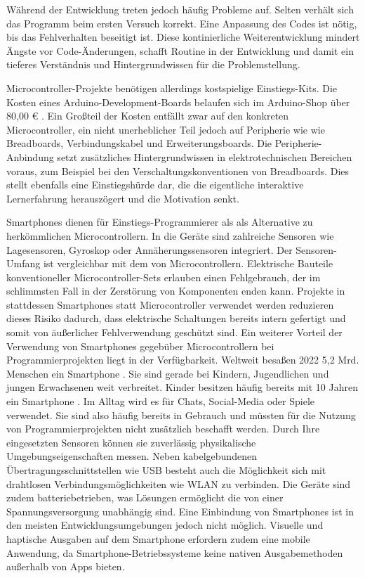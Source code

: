 \documentclass[11pt,a4paper]{report}
\begin{document}
Während der Entwicklung treten jedoch häufig Probleme auf.
Selten verhält sich das Programm beim ersten Versuch korrekt.
Eine Anpassung des Codes ist nötig, bis das Fehlverhalten beseitigt ist.
Diese kontinierliche Weiterentwicklung mindert Ängste vor Code-Änderungen, schafft Routine in der Entwicklung und damit ein tieferes Verständnis und Hintergrundwissen für die Problemstellung.

Microcontroller-Projekte benötigen allerdings kostspielige Einstiegs-Kits.
Die Kosten eines Arduino-Development-Boards belaufen sich im Arduino-Shop über 80,00 € \cite{arduino_kit}.
Ein Großteil der Kosten entfällt zwar auf den konkreten Microcontroller, ein nicht unerheblicher Teil jedoch auf Peripherie wie wie Breadboards, Verbindungskabel und Erweiterungsboards.
Die Peripherie-Anbindung setzt zusätzliches Hintergrundwissen in elektrotechnischen Bereichen voraus, zum  Beispiel bei den Verschaltungskonventionen von Breadboards.
Dies stellt ebenfalls eine Einstiegshürde dar, die die eigentliche interaktive Lernerfahrung herauszögert und die Motivation senkt.

Smartphones dienen für Einstiegs-Programmierer als als Alternative zu herkömmlichen Microcontrollern.
In die Geräte sind zahlreiche Sensoren wie Lagesensoren, Gyroskop oder Annäherungssensoren integriert.
Der Sensoren-Umfang ist vergleichbar mit dem von Microcontrollern.
Elektrische Bauteile konventioneller Microcontroller-Sets erlauben einen Fehlgebrauch, der im schlimmsten Fall in der Zerstörung von Komponenten enden kann.
Projekte in stattdessen Smartphones statt Microcontroller verwendet werden reduzieren dieses Risiko dadurch, dass elektrische Schaltungen bereits intern gefertigt und somit von äußerlicher Fehlverwendung geschützt sind.
Ein weiterer Vorteil der Verwendung von Smartphones gegebüber Microcontrollern bei Programmierprojekten liegt in der Verfügbarkeit.
Weltweit besaßen 2022 5,2 Mrd. Menschen ein Smartphone \cite{smartphone_users}.
Sie sind gerade bei Kindern, Jugendlichen und jungen Erwachsenen weit verbreitet.
Kinder besitzen häufig bereits mit 10 Jahren ein Smartphone \cite{bitkom_smartphones}.
Im Alltag wird es für Chats, Social-Media oder Spiele verwendet.
Sie sind also häufig bereits in Gebrauch und müssten für die Nutzung von Programmierprojekten nicht zusätzlich beschafft werden.
Durch Ihre eingesetzten Sensoren können sie zuverlässig physikalische Umgebungseigenschaften messen.
Neben kabelgebundenen Übertragungsschnittstellen wie USB besteht auch die Möglichkeit sich mit drahtlosen Verbindungsmöglichkeiten wie WLAN zu verbinden.
Die Geräte sind zudem batteriebetrieben, was Lösungen ermöglicht die von einer Spannungsversorgung unabhängig sind.
Eine Einbindung von Smartphones ist in den meisten Entwicklungsumgebungen jedoch nicht möglich.
Visuelle und haptische Ausgaben auf dem Smartphone erfordern zudem eine mobile Anwendung, da Smartphone-Betriebssysteme keine nativen Ausgabemethoden außerhalb von Apps bieten.
\end{document}
